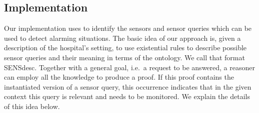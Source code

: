 % 
% 
% 
% 







\subsection{Implementation}\label{implementation}
Our implementation uses \nthreelogic %
to identify the 
sensors and sensor queries which can be used to detect alarming situations. 
The basic idea of our approach is, given a description of the hospital's setting, to use existential rules  
to describe possible sensor queries and their meaning 
in terms of the ontology. We call that format SENSdesc. 
Together with a general goal, i.e.\ a request to be answered, 
a reasoner can employ all the knowledge to produce a proof. 
If this proof contains the instantiated version of a sensor query, this occurrence
indicates that in the given context this query is relevant  and needs to be monitored. 
We explain the details of this idea below. 

